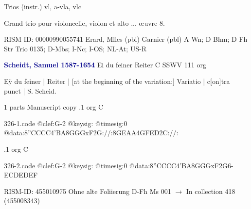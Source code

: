 \documentclass[twocolumn]{book}
\begin{document}
\newline Trios (instr.)    
\newline vl, a-vla, vlc
\newline \begin{itshape}Grand trio pour violoncelle, violon et alto ... œuvre 8.\end{itshape} 
\newline RISM-ID: 00000990055741
\newline Erard, Mlles  (pbl)
\newline Garnier  (pbl)
\newline A-Wn; D-Bhm; D-Fh  Str Trio 0135; D-Mbs; I-Nc; I-OS; NL-At; US-R
\newline \par \vspace{7pt} \textcolor{darkblue}{\textbf{Scheidt, Samuel  1587-1654}}
\newline Ei du feiner Reiter  C  SSWV 111
\newline org
\newline \begin{itshape}[f.91v, at left:] Eÿ du feiner | Reiter | [at the beginning of the variation:] Variatio | c[on]tra punct | S. Scheid.\end{itshape} 
\newline \textcolor{darkblue}{}  1 parts  
\newline Manuscript copy
.1  org  C  
\begin{filecontents*}{326-1.code}
@clef:G-2
@keysig:
@timesig:0
@data:8''CCCC4'BA8GGGxF2G://:8GEAA4GFED2C://:
\end{filecontents*}
\newline
%

.1  org  C  
\begin{filecontents*}{326-2.code}
@clef:G-2
@keysig:
@timesig:0
@data:8''CCCC4'BA8GGGxF2G6-{ECD}{EDEF}
\end{filecontents*}
\newline
%

\newline RISM-ID: 455010975
\newline Ohne alte Foliierung
\newline D-Fh  Ms 001
\newline $\rightarrow$ In collection 418 (455008343)
\end{document}
